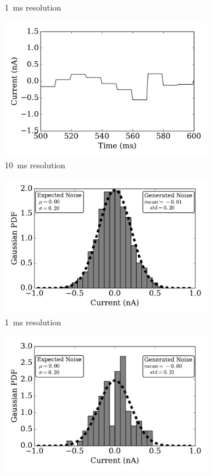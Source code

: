 \begin{figure}
\begin{subfigure}[t]{0.49\textwidth}
			\caption{1~ms resolution}
			\label{Fig:signal-1}
		\end{subfigure}
		\begin{subfigure}[t]{0.49\textwidth}
			\includegraphics[width=\textwidth]{pics_iconip/curr_dt10.pdf}
			\caption{10~ms resolution}
			\label{Fig:signal-10}
		\end{subfigure}
		\begin{subfigure}[t]{0.49\textwidth}
			\includegraphics[width=\textwidth]{pics_iconip/distr_dt1.pdf}
			\caption{1~ms resolution}
			\label{Fig:gaussian-1}
		\end{subfigure}
		\begin{subfigure}[t]{0.49\textwidth}
			\includegraphics[width=\textwidth]{pics_iconip/distr_dt10.pdf}

\end{subfigure}
\end{figure}
